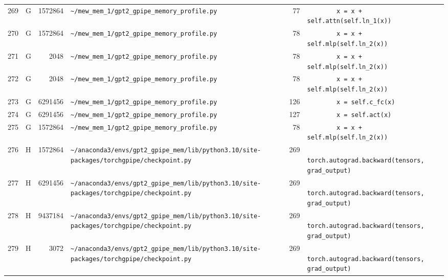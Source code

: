 \documentclass{article}
\begin{document}
\begin{longtable}{r l r p{6.5cm} r p{7.0cm}}
269 & G & 1572864 & \lstinline|~/mew_mem_1/gpt2_gpipe_memory_profile.py| & 77 & \lstinline|        x = x + self.attn(self.ln_1(x))| \\
270 & G & 1572864 & \lstinline|~/mew_mem_1/gpt2_gpipe_memory_profile.py| & 78 & \lstinline|        x = x + self.mlp(self.ln_2(x))| \\
271 & G & 2048 & \lstinline|~/mew_mem_1/gpt2_gpipe_memory_profile.py| & 78 & \lstinline|        x = x + self.mlp(self.ln_2(x))| \\
272 & G & 2048 & \lstinline|~/mew_mem_1/gpt2_gpipe_memory_profile.py| & 78 & \lstinline|        x = x + self.mlp(self.ln_2(x))| \\
273 & G & 6291456 & \lstinline|~/mew_mem_1/gpt2_gpipe_memory_profile.py| & 126 & \lstinline|        x = self.c_fc(x)| \\
274 & G & 6291456 & \lstinline|~/mew_mem_1/gpt2_gpipe_memory_profile.py| & 127 & \lstinline|        x = self.act(x)| \\
275 & G & 1572864 & \lstinline|~/mew_mem_1/gpt2_gpipe_memory_profile.py| & 78 & \lstinline|        x = x + self.mlp(self.ln_2(x))| \\
276 & H & 1572864 & \lstinline|~/anaconda3/envs/gpt2_gpipe_mem/lib/python3.10/site-packages/torchgpipe/checkpoint.py| & 269 & \lstinline|            torch.autograd.backward(tensors, grad_output)| \\
277 & H & 6291456 & \lstinline|~/anaconda3/envs/gpt2_gpipe_mem/lib/python3.10/site-packages/torchgpipe/checkpoint.py| & 269 & \lstinline|            torch.autograd.backward(tensors, grad_output)| \\
278 & H & 9437184 & \lstinline|~/anaconda3/envs/gpt2_gpipe_mem/lib/python3.10/site-packages/torchgpipe/checkpoint.py| & 269 & \lstinline|            torch.autograd.backward(tensors, grad_output)| \\
279 & H & 3072 & \lstinline|~/anaconda3/envs/gpt2_gpipe_mem/lib/python3.10/site-packages/torchgpipe/checkpoint.py| & 269 & \lstinline|            torch.autograd.backward(tensors, grad_output)| \\
\end{longtable}
\end{document}
